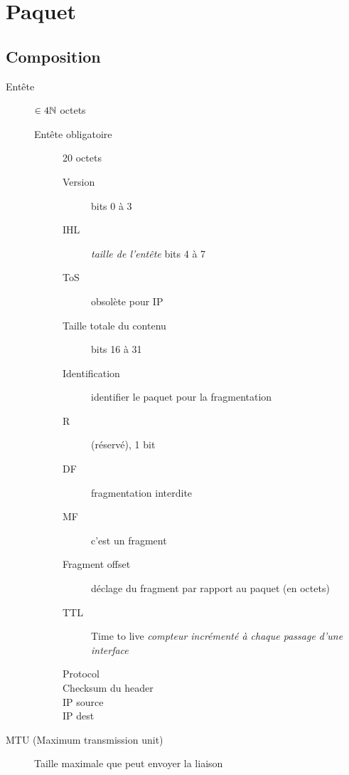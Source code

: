 \documentclass{article}
\begin{document}
\section{Paquet}

\subsection{Composition}

\begin{description}
    \item[Entête] $\in 4\mathbb{N}$ octets
        \begin{description}
            \item[Entête obligatoire] 20 octets 
                \begin{description}
                    \item[Version] bits 0 à 3
                    \item[IHL] \emph{taille de l'entête} bits 4 à 7
                    \item[ToS] obsolète pour IP
                    \item[Taille totale du contenu]  bits 16 à 31
                    \item[Identification] identifier le paquet pour la fragmentation
                    \item[R] (réservé), 1 bit
                    \item[DF] fragmentation interdite
                    \item[MF] c'est un fragment
                    \item[Fragment offset] déclage du fragment par rapport au paquet (en octets)
                    \item[TTL] Time to live \emph{compteur incrémenté à chaque passage d'une interface} 
                    \item[Protocol] 
                    \item[Checksum du header] 
                    \item[IP source] 
                    \item[IP dest] 
                \end{description}
        \end{description}
\end{description}


\begin{description}
    \item[MTU (Maximum transmission unit)] Taille maximale que peut envoyer la liaison
\end{description}
\end{document}
